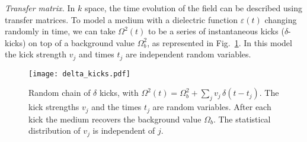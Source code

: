 \documentclass[ prl, twocolumn, superscriptaddress, amsfonts, amsmath,floatfix]{revtex4-1}
\begin{document}
{\it Transfer matrix.}
In $k$ space, the time evolution of the field can be described using transfer matrices. 
To model a medium with a dielectric function $\varepsilon(t)$ changing randomly in time, we can take {$\Omega^2(t)$ to be a series of instantaneous kicks ($\delta$-kicks) on top of a background value $\Omega^2_b$,} as represented in Fig.~\ref{fig:delta_kicks}. In this model the kick strength $v_j$ and times $t_j$ are independent random variables.
%
\begin{figure}[h]
     \begin{center}
     \texttt{[image: delta\_kicks.pdf]}
     \end{center}    
     \caption{\label{fig:delta_kicks} Random chain of $\delta$ kicks, with $\Omega^2(t) = \Omega_b^2 + \sum_j v_j \, \delta(t-t_j)$. The kick strengths $v_j$ and the times $t_j$ are random variables. After each kick the medium recovers the background value $\Omega_b$. The statistical distribution of $v_j$ is independent of $j$.
       }
\end{figure}
%
\end{document}
